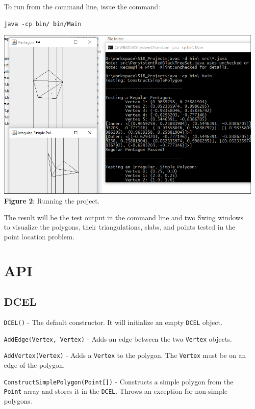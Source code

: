 \documentclass[11pt]{article}
\begin{document}
	To run from the command line, issue the command:
	
	\begin{center}
		\texttt{java -cp bin/ bin/Main}
	\end{center}
	
	\begin{center}
		\includegraphics[scale=0.5]{running} \\
		\textbf{Figure 2}: Running the project.
	\end{center}
	
	The result will be the test output in the command line and two Swing windows to visualize the polygons, their triangulations, slabs, and points tested in the point location problem.
	
\section{API}
\label{sec:api}

\subsection{DCEL}
\label{sec:dcel}

	\texttt{DCEL()} - The default constructor. It will initialize an empty \texttt{DCEL} object.
	
	\texttt{AddEdge(Vertex, Vertex)} - Adds an edge between the two \texttt{Vertex} objects.
	
	\texttt{AddVertex(Vertex)} - Adds a \texttt{Vertex} to the polygon. The \texttt{Vertex} must be on an edge of the polygon.
	
	\texttt{ConstructSimplePolygon(Point[])} - Constructs a simple polygon from the \texttt{Point} array and stores it in the \texttt{DCEL}. Throws an exception for non-simple polygons.
	
\end{document}
